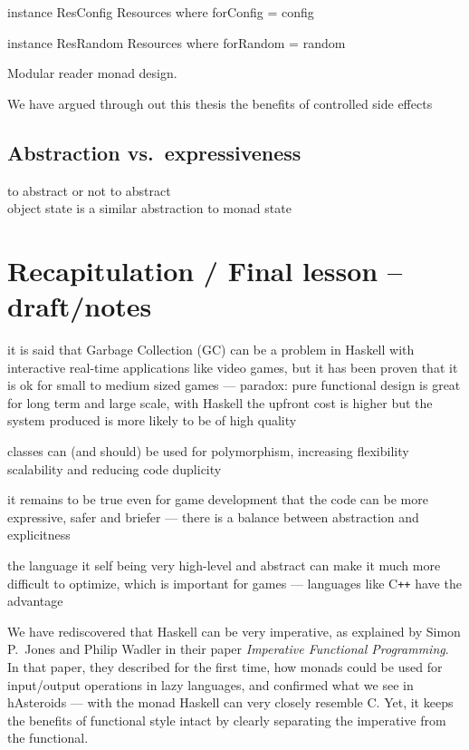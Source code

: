 \documentclass[
  digital, %
  color,   %
  table,   %
  oneside, %
  lof,     %
  lot,     %
]{fithesis3}
\newcommand{\cpp}{C\nolinebreak\texttt{+}\nolinebreak\texttt{+}}
\newcommand{\vs}{vs.\ }
\begin{document}
{\begin{listing}
\begin{haskell}
instance ResConfig Resources where
    forConfig = config
    
instance ResRandom Resources where
    forRandom = random
\end{haskell}
\caption{Modular reader monad design.}
\end{listing}

We have argued through out this thesis the benefits of controlled side effects



\subsection{Abstraction \vs expressiveness}

to abstract or not to abstract\\
object state is a similar abstraction to monad state\\



\section{Recapitulation / Final lesson -- draft/notes}

it is said that Garbage Collection (GC) can be a problem in Haskell
with interactive real-time applications like video games, but it has been proven that
it is ok for small to medium sized games
--- paradox: pure functional design is great for long term and large scale,
with Haskell the upfront cost is higher but the system produced is more likely to be of high quality

classes can (and should) be used for polymorphism, increasing flexibility scalability and
reducing code duplicity

it remains to be true even for game development that the code can be more expressive,
safer and briefer --- there is a balance between abstraction and explicitness

the language it self being very high-level and abstract can make it much more
difficult to optimize, which is important for games --- languages like \cpp{} have the advantage

We have rediscovered that Haskell can be very imperative, as explained by Simon P.~Jones and
Philip Wadler in their paper \textit{Imperative Functional Programming}.\cite{imperativefp}
In that paper, they described for the first time, how monads could be used for input/output operations
in lazy languages, and confirmed what we see in hAsteroids ---  with the  monad
Haskell can very closely resemble C. Yet, it keeps the benefits of functional style intact by
clearly separating the imperative from the functional.

}
\end{document}
